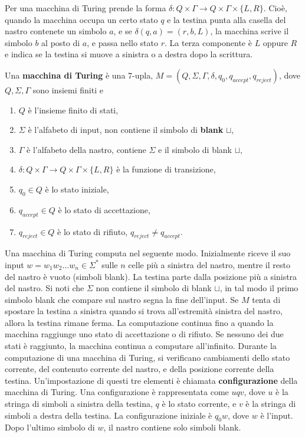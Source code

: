 \documentclass{article}
\begin{document}
Per una macchina di Turing prende la forma $\delta: Q \times \Gamma \rightarrow Q \times \Gamma \times \{L,R\}$.
Cioè, quando la macchina occupa un certo stato $q$ e la testina punta alla casella del nastro contenete un simbolo $a$, e se $\delta(q,a) = (r,b,L)$, la macchina scrive il simbolo $b$ al posto di $a$, e passa nello stato $r$.
La terza componente è $L$ oppure $R$ e indica se la testina si muove a sinistra o a destra dopo la scrittura.

\begin{tcolorbox}[colback=green!10!white, colframe=green!50!black, title=Definizione 3.3]
    Una \textbf{macchina di Turing} è una 7-upla, $M = (Q, \Sigma, \Gamma, \delta, q_0, q_{accept}, q_{reject})$, dove $Q, \Sigma, \Gamma$ sono insiemi finiti e
    \begin{enumerate}
        \item $Q$ è l'insieme finito di stati,
        \item $\Sigma$ è l'alfabeto di input, non contiene il simbolo di \textbf{blank} $\sqcup$,
        \item $\Gamma$ è l'alfabeto della nastro, contiene $\Sigma$ e il simbolo di blank $\sqcup$,
        \item $\delta: Q \times \Gamma \rightarrow Q \times \Gamma \times \{L,R\}$ è la funzione di transizione,
        \item $q_0 \in Q$ è lo stato iniziale,
        \item $q_{accept} \in Q$ è lo stato di accettazione,
        \item $q_{reject} \in Q$ è lo stato di rifiuto, $q_{reject} \neq q_{accept}$.
    \end{enumerate}
\end{tcolorbox}

Una macchina di Turing computa nel seguente modo.
Inizialmente riceve il suo input $w = w_1w_2...w_n \in \Sigma^*$ sulle $n$ celle più a sinistra del nastro, mentre il resto del nastro è vuoto (simboli blank).
La testina parte dalla posizione più a sinistra del nastro.
Si noti che $\Sigma$ non contiene il simbolo di blank $\sqcup$, in tal modo il primo simbolo blank che compare sul nastro segna la fine dell'input.
Se $M$ tenta di spostare la testina a sinistra quando si trova all'estremità sinistra del nastro, allora la testina rimane ferma.
La computazione continua fino a quando la macchina raggiunge uno stato di accettazione o di rifiuto.
Se nessuno dei due stati è raggiunto, la macchina continua a computare all'infinito.
Durante la computazione di una macchina di Turing, si verificano cambiamenti dello stato corrente, del contenuto corrente del nastro, e della posizione corrente della testina.
Un'impostazione di questi tre elementi è chiamata \textbf{configurazione} della macchina di Turing.
Una configurazione è rappresentata come $uqv$, dove $u$ è la stringa di simboli a sinistra della testina, $q$ è lo stato corrente, e $v$ è la stringa di simboli a destra della testina.
La configurazione iniziale è $q_0w$, dove $w$ è l'input.
Dopo l'ultimo simbolo di $w$, il nastro contiene solo simboli blank.
\end{document}
